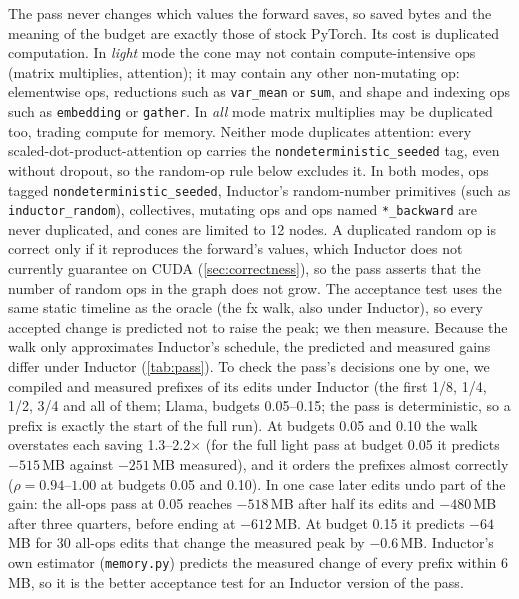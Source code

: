 \documentclass[10pt]{article}
\newcommand{\code}[1]{\texttt{#1}}
\begin{document}
The pass never changes which values the forward saves, so saved bytes and the meaning of the budget are exactly those of
stock PyTorch. Its cost is duplicated computation. In \emph{light} mode the cone may not contain compute-intensive ops
(matrix multiplies, attention); it may contain any other non-mutating op: elementwise ops, reductions such as
\code{var\_mean} or \code{sum}, and shape and indexing ops such as \code{embedding} or \code{gather}. In \emph{all} mode matrix multiplies may be duplicated too, trading compute for
memory. Neither mode duplicates attention: every scaled-dot-product-attention op carries the
\code{nondeterministic\_seeded} tag, even without dropout, so the random-op rule below excludes it. In both modes, ops tagged \code{nondeterministic\_seeded}, Inductor's random-number primitives (such as
\code{inductor\_random}), collectives, mutating ops and ops named \code{*\_backward} are never duplicated, and cones are
limited to 12 nodes. A duplicated random op is correct only if it reproduces the forward's values, which Inductor does not
currently guarantee on CUDA (\cref{sec:correctness}), so the pass asserts that the number of random ops in the graph does
not grow.
The acceptance test uses the same static timeline as the oracle (the fx walk, also under Inductor), so every accepted
change is predicted not to raise the peak; we then measure. Because the walk only approximates Inductor's schedule, the
predicted and measured gains differ under Inductor (\cref{tab:pass}). To check the pass's decisions one by one, we
compiled and measured prefixes of its edits under Inductor (the first 1/8, 1/4, 1/2, 3/4 and all of them; Llama, budgets
0.05--0.15; the pass is deterministic, so a prefix is exactly the start of the full run). At budgets 0.05 and 0.10 the walk overstates each saving
1.3--2.2$\times$ (for the full light pass at budget 0.05 it predicts $-515$\,MB against $-251$\,MB measured), and it orders the
prefixes almost correctly ($\rho=0.94$--$1.00$ at budgets 0.05 and 0.10). In one case later edits undo part of the gain:
the all-ops pass at 0.05 reaches $-518$\,MB after half its edits and $-480$\,MB after three quarters, before ending at
$-612$\,MB. At budget 0.15 it predicts $-64$\,MB for 30 all-ops edits that change the measured peak by $-0.6$\,MB.
Inductor's own estimator (\code{memory.py}) predicts the measured change of every prefix within 6\,MB, so it is the better
acceptance test for an Inductor version of the pass.
\end{document}

